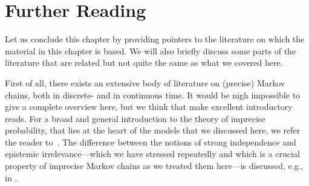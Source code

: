 \documentclass[graybox]{svmult}
\newcommand{\reals}{\mathbb{R}}
\newcommand{\realsnonneg}{\reals_{\geq 0}}
\begin{document}

\section{Further Reading}\label{sec:further_reading}

Let us conclude this chapter by providing pointers to the literature on which the material in this chapter is based. We will also briefly discuss some parts of the literature that are related but not quite the same as what we covered here.

First of all, there exists an extensive body of literature on (precise) Markov chains, both in discrete- and in continuous time. It would be nigh impossible to give a complete overview here, but we think that \cite{norris1998markov, anderson1991} make excellent introductory reads. For a broad and general introduction to the theory of imprecise probability, that lies at the heart of the models that we discussed here, we refer the reader to~\cite{Walley:1991vk,augustin:2014}. The difference between the notions of strong independence and epistemic irrelevance---which we have stressed repeatedly and which is a crucial property of imprecise Markov chains as we treated them here---is discussed, e.g., in \cite{couso:2000, chap_irr_ind:itip:2014}.
\end{document}
